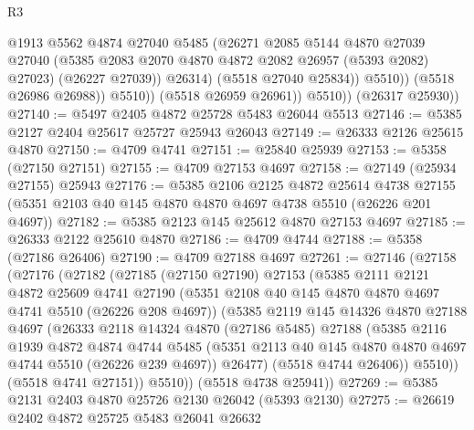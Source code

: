 \begin{lexlean}{R3}
\begin{coremodule}
                          @1913
                          @5562
                          @4874
                          @27040
                          @5485
                          (@26271
                            @2085
                            @5144
                            @4870
                            @27039
                            @27040
                            (@5385 @2083 @2070 @4870 @4872 @2082 @26957 (@5393 @2082) @27023)
                            (@26227 @27039))
                          @26314)
                        (@5518 @27040 @25834))
                      @5510))
                  (@5518 @26986 @26988))
                @5510))
            (@5518 @26959 @26961))
          @5510))
      (@26317 @25930))
@27140 := @5497 @2405 @4872 @25728 @5483 @26044 @5513
@27146 := @5385 @2127 @2404 @25617 @25727 @25943 @26043
@27149 := @26333 @2126 @25615 @4870
@27150 := @4709 @4741
@27151 := @25840 @25939
@27153 := @5358 (@27150 @27151)
@27155 := @4709 @27153 @4697
@27158 := @27149 (@25934 @27155) @25943
@27176 := @5385
    @2106
    @2125
    @4872
    @25614
    @4738
    @27155
    (@5351 @2103 @40 @145 @4870 @4870 @4697 @4738 @5510 (@26226 @201 @4697))
@27182 := @5385 @2123 @145 @25612 @4870 @27153 @4697
@27185 := @26333 @2122 @25610 @4870
@27186 := @4709 @4744
@27188 := @5358 (@27186 @26406)
@27190 := @4709 @27188 @4697
@27261 := @27146
    (@27158
      (@27176
        (@27182
          (@27185
            (@27150 @27190)
            @27153
            (@5385
              @2111
              @2121
              @4872
              @25609
              @4741
              @27190
              (@5351 @2108 @40 @145 @4870 @4870 @4697 @4741 @5510 (@26226 @208 @4697))
              (@5385
                @2119
                @145
                @14326
                @4870
                @27188
                @4697
                (@26333
                  @2118
                  @14324
                  @4870
                  (@27186 @5485)
                  @27188
                  (@5385
                    @2116
                    @1939
                    @4872
                    @4874
                    @4744
                    @5485
                    (@5351 @2113 @40 @145 @4870 @4870 @4697 @4744 @5510 (@26226 @239 @4697))
                    @26477)
                  (@5518 @4744 @26406))
                @5510))
            (@5518 @4741 @27151))
          @5510))
      (@5518 @4738 @25941))
@27269 := @5385 @2131 @2403 @4870 @25726 @2130 @26042 (@5393 @2130)
@27275 := @26619 @2402 @4872 @25725 @5483 @26041 @26632

\end{coremodule}
\end{lexlean}
